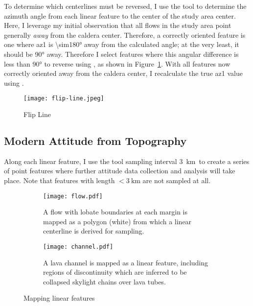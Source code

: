 To determine which centerlines must be reversed, I use the  tool to determine the azimuth angle from each linear feature to the center of the study area \acs{center}. Here, I leverage my initial observation that all flows in the study area point generally \emph{away} from the caldera center. Therefore, a correctly oriented feature is one where \acs{az1} is \ang{\sim180} away from the calculated angle; at the very least, it should be \ang{90} away. Therefore I select features where this angular difference is less than \ang{90} to reverse using , as shown in Figure~\ref{fig:flip-line}. With all features now correctly oriented away from the caldera center, I recalculate the true \ac{az1} value using .

\begin{figure}
    \texttt{[image: flip-line.jpeg]}%
    \caption{Flip Line}%
    \label{fig:flip-line}
\end{figure}

\subsection{Modern Attitude from Topography}

\newcommand{\samplinginterval}{\qty{3}{\km}}

Along each linear feature, I use the  tool sampling interval \samplinginterval\ to create a series of point features where further attitude data collection and analysis will take place. Note that features with length $<\samplinginterval$ are not sampled at all.

\begin{figure}
    \centering
    \begin{subfigure}{\textwidth}
        \centering
        \texttt{[image: flow.pdf]}
        \caption[Mapped lava flow \& centerline]{A flow with lobate boundaries at each margin is mapped as a polygon (white) from which a linear centerline is derived for sampling.}%
        \label{fig:flow}
    \end{subfigure}
    \begin{subfigure}{\textwidth}
        \centering
        \texttt{[image: channel.pdf]}
        \caption[Mapped lava channel]{A lava channel is mapped as a linear feature, including regions of discontinuity which are inferred to be collapsed skylight chains over lava tubes.}%
        \label{fig:channel}
    \end{subfigure}
    \caption{Mapping linear features}%
    \label{fig:mapping-linear}
\end{figure}

